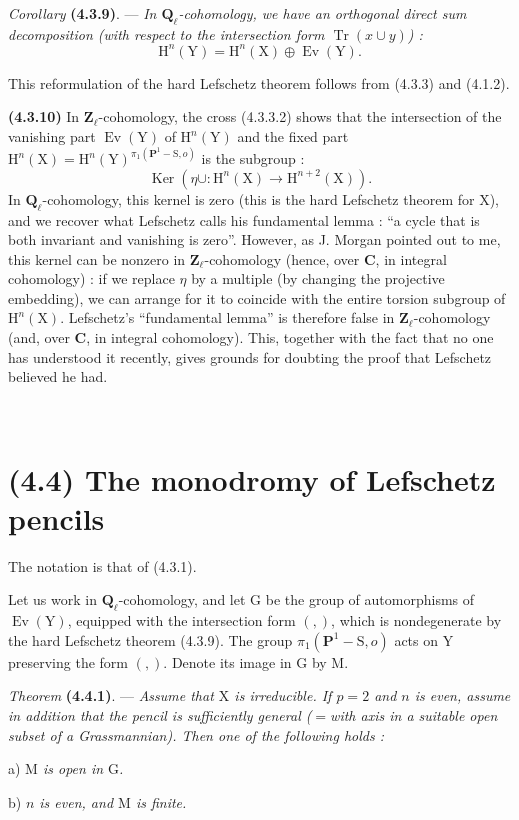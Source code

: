 \documentclass[11pt,leqno]{article}
\newcommand{\Page}[1]{\ifvmode\noindent\else\unskip\ \fi{\footnotesize\textcolor{gray}{[p.\,#1]}}\ \ignorespaces}
\begin{document}
\textit{Corollary} \textbf{(4.3.9)}. — \textit{In \(\mathbf{Q}_\ell\)-cohomology, we have an orthogonal direct sum decomposition (with respect to the intersection form \(\operatorname{Tr}(x\cup y)\)) :}
\[
\mathrm{H}^n(\mathrm{Y})=\mathrm{H}^n(\mathrm{X})\oplus\operatorname{Ev}(\mathrm{Y}).
\]

This reformulation of the hard Lefschetz theorem follows from (4.3.3) and (4.1.2).

\textbf{(4.3.10)} In \(\mathbf{Z}_\ell\)-cohomology, the cross (4.3.3.2) shows that the intersection of the vanishing part \(\operatorname{Ev}(\mathrm{Y})\) of \(\mathrm{H}^n(\mathrm{Y})\) and the fixed part \(\mathrm{H}^n(\mathrm{X})=\mathrm{H}^n(\mathrm{Y})^{\pi_1(\mathbf{P}^1-\mathrm{S},o)}\) is the subgroup :
\[
\operatorname{Ker}(\eta\cup:\mathrm{H}^n(\mathrm{X})\to\mathrm{H}^{n+2}(\mathrm{X})).
\]
In \(\mathbf{Q}_\ell\)-cohomology, this kernel is zero (this is the hard Lefschetz theorem for \(\mathrm{X}\)), and we recover what Lefschetz calls his fundamental lemma : “a cycle that is both invariant and vanishing is zero”. However, as J. Morgan pointed out to me, this kernel can be nonzero in \(\mathbf{Z}_\ell\)-cohomology (hence, over \(\mathbf{C}\), in integral cohomology) : if we replace \(\eta\) by a multiple (by changing the projective embedding), we can arrange for it to coincide with the entire torsion subgroup of \(\mathrm{H}^n(\mathrm{X})\). Lefschetz’s “fundamental lemma” is therefore false in \(\mathbf{Z}_\ell\)-cohomology (and, over \(\mathbf{C}\), in integral cohomology). This, together with the fact that no one has understood it recently, gives grounds for doubting the proof that Lefschetz believed he had.

\Page{227}
\section*{(4.4) The monodromy of Lefschetz pencils}

The notation is that of (4.3.1).

Let us work in \(\mathbf{Q}_\ell\)-cohomology, and let \(\mathrm{G}\) be the group of automorphisms of \(\operatorname{Ev}(\mathrm{Y})\), equipped with the intersection form \((,)\), which is nondegenerate by the hard Lefschetz theorem (4.3.9). The group \(\pi_1(\mathbf{P}^1-\mathrm{S},o)\) acts on \(\mathrm{Y}\) preserving the form \((,)\). Denote its image in \(\mathrm{G}\) by \(\mathrm{M}\).

\textit{Theorem} \textbf{(4.4.1)}. — \textit{Assume that \(\mathrm{X}\) is irreducible. If \(p=2\) and \(n\) is even, assume in addition that the pencil is sufficiently general (\(=\)with axis in a suitable open subset of a Grassmannian). Then one of the following holds :}
\par\noindent a) \textit{\(\mathrm{M}\) is open in \(\mathrm{G}\).}
\par\noindent b) \textit{\(n\) is even, and \(\mathrm{M}\) is finite.}
\end{document}
